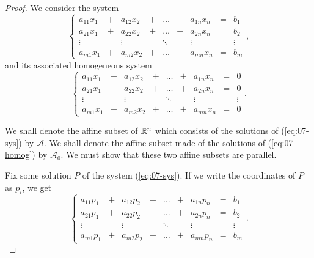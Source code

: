 \documentclass[elementsmain.tex]{subfiles}
\begin{document}
\begin{proof} We consider the system
\begin{equation}\label{eq:07-sys}
\left\{
\begin{array}{ccccccccc}
a_{11} x_1 & + & a_{12} x_2 & + & \dots & + & a_{1n} x_n & = & b_1 \\
a_{21} x_1 & + & a_{22} x_2 & + & \dots & + & a_{2n} x_n & = & b_2 \\
\vdots     &   & \vdots     &   & \ddots &  & \vdots     &  & \vdots \\ 
a_{m1} x_1 & + & a_{m2} x_2 & + & \dots & + & a_{mn} x_n & = & b_m 
\end{array}\right.,
\end{equation}
and its associated homogeneous system
\begin{equation}\label{eq:07-homog}
\left\{
\begin{array}{ccccccccc}
a_{11} x_1 & + & a_{12} x_2 & + & \dots & + & a_{1n} x_n & = & 0 \\
a_{21} x_1 & + & a_{22} x_2 & + & \dots & + & a_{2n} x_n & = & 0 \\
\vdots     &   & \vdots     &   & \ddots &  & \vdots     &  & \vdots \\ 
a_{m1} x_1 & + & a_{m2} x_2 & + & \dots & + & a_{mn} x_n & = & 0 
\end{array}\right. .
\end{equation}

We shall denote the affine subset of $\mathbb{R}^n$ which consists of the solutions of (\ref{eq:07-sys}) by $\mathcal{A}$. We shall denote the affine subset made of the solutions of (\ref{eq:07-homog}) by $\mathcal{A}_0$. We must show that these two affine subsets are parallel.


Fix some solution $P$ of the system (\ref{eq:07-sys}). If we write the coordinates of $P$ as $p_i$, we get 
\begin{equation}\label{eq:07-big1}
\left\{
\begin{array}{ccccccccc}
a_{11} p_1 & + & a_{12} p_2 & + & \dots & + & a_{1n} p_n & = & b_1 \\
a_{21} p_1 & + & a_{22} p_2 & + & \dots & + & a_{2n} p_n & = & b_2 \\
\vdots     &   & \vdots     &   & \ddots &  & \vdots     &  & \vdots \\ 
a_{m1} p_1 & + & a_{m2} p_2 & + & \dots & + & a_{mn} p_n & = & b_m 
\end{array}\right..
\end{equation}



\end{proof}
\end{document}

